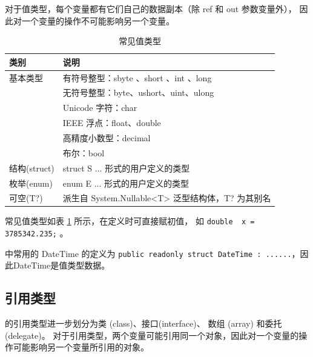 对于值类型，每个变量都有它们自己的数据副本（除 ref 和 out 参数变量外），
因此对一个变量的操作不可能影响另一个变量。

\begin{table}[htbp]
    \centering
    \caption{常见值类型}
    \label{tab:valuetype}
    \begin{tabular}{l|l}
        \hline
        类别         & 说明                                   \\
        \hline
        基本类型       & 有符号整型：sbyte 、short 、int 、long        \\
                   & 无符号整型：byte、ushort、uint、ulong         \\
                   & Unicode 字符：char                      \\
                   & IEEE 浮点：float、double                 \\
                   & 高精度小数型：decimal                       \\
                   & 布尔：bool                              \\
        结构(struct) & struct S {...} 形式的用户定义的类型            \\
        枚举(enum)   & enum E {...} 形式的用户定义的类型              \\
        可空(T?)     & 派生自 System.Nullable<T> 泛型结构体，T? 为其别名 \\
        \hline
    \end{tabular}
\end{table}

常见值类型如表 \ref{tab:valuetype} 所示，在定义时可直接赋初值，
如 \verb|double  x = 3785342.235;| 。

\cs 中常用的 DateTime 的定义为 \verb|public readonly struct DateTime : ......|，因此DateTime是值类型数据。

\subsection{引用类型}
\cs  的引用类型进一步划分为类 (class)、接口(interface)、
数组 (array) 和委托(delegate)。
对于引用类型，两个变量可能引用同一个对象，因此对一个变量的操作可能影响另一个变量所引用的对象。

